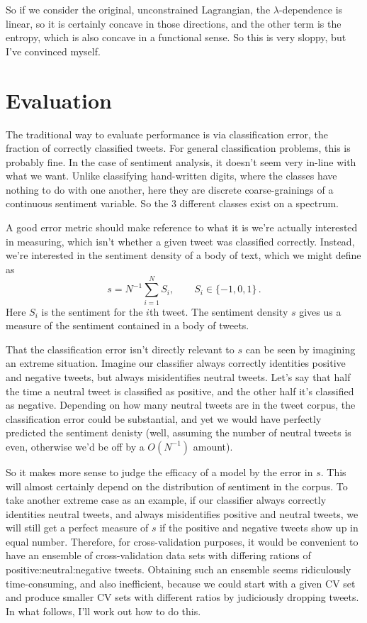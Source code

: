 \documentclass[a4paper,12pt]{article}
\begin{document}
So if we consider the original, unconstrained Lagrangian, the $\lambda$-dependence is linear, so it is certainly concave in those directions, and the other term is the entropy, which is also concave in a functional sense. So this is very sloppy, but I've convinced myself.



\section{Evaluation}
The traditional way to evaluate performance is via classification error, the fraction of correctly classified tweets. For general classification problems, this is probably fine. In the case of sentiment analysis, it doesn't seem very in-line with what we want. Unlike classifying hand-written digits, where the classes have nothing to do with one another, here they are discrete coarse-grainings of a continuous sentiment variable. So the 3 different classes exist on a spectrum. 

A good error metric should make reference to what it is we're actually interested in measuring, which isn't whether a given tweet was classified correctly. Instead, we're interested in the sentiment density of a body of text, which we might define as
\begin{equation}
s = N^{-1} \sum_{i=1}^N S_i, \qquad S_i \in \{ -1, 0, 1 \} \, .
\end{equation}
Here $S_i$ is the sentiment for the $i$th tweet. The sentiment density $s$ gives us a measure of the sentiment contained in a body of tweets.

That the classification error isn't directly relevant to $s$ can be seen by imagining an extreme situation. Imagine our classifier always correctly identities positive and negative tweets, but always misidentifies neutral tweets. Let's say that half the time a neutral tweet is classified as positive, and the other half it's classified as negative. Depending on how many neutral tweets are in the tweet corpus, the classification error could be substantial, and yet we would have perfectly predicted the sentiment denisty (well, assuming the number of neutral tweets is even, otherwise we'd be off by a $O(N^{-1})$ amount). 

So it makes more sense to judge the efficacy of a model by the error in $s$. This will almost certainly depend on the distribution of sentiment in the corpus. To take another extreme case as an example, if our classifier always correctly identities neutral tweets, and always misidentifies positive and neutral tweets, we will still get a perfect measure of $s$ if the positive and negative tweets show up in equal number. Therefore, for cross-validation purposes, it would be convenient to have an ensemble of cross-validation data sets with differing rations of positive:neutral:negative tweets. Obtaining such an ensemble seems ridiculously time-consuming, and also inefficient, because we could start with a given CV set and produce smaller CV sets with different ratios by judiciously dropping tweets. In what follows, I'll work out how to do this.
\end{document}
